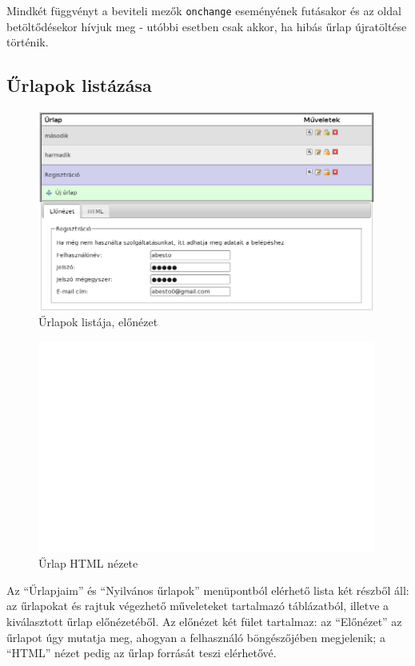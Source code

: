 \documentclass[12pt,a4paper,twoside]{article}
\begin{document}
Mindkét függvényt a beviteli mezők \texttt{onchange} eseményének futásakor és az
oldal betöltődésekor hívjuk meg - utóbbi esetben csak akkor, ha hibás űrlap
újratöltése történik.


\clearpage
{}
\subsection{Űrlapok listázása}

\begin{figure}[H]
\centering
  \includegraphics[width=420px]{form_list.png}
  \caption{Űrlapok listája, előnézet}
\end{figure}
\begin{figure}[H]
  \includegraphics[width=420px]{form_list_html.png}
  \caption{Űrlap HTML nézete}
\end{figure}
\clearpage

Az ``Űrlapjaim'' és ``Nyilvános űrlapok'' menüpontból elérhető lista két részből
áll: az űrlapokat és rajtuk végezhető műveleteket tartalmazó táblázatból,
illetve a kiválasztott űrlap előnézetéből. Az előnézet két fület tartalmaz: az
``Előnézet'' az űrlapot úgy mutatja meg, ahogyan a felhasználó böngészőjében
megjelenik; a ``HTML'' nézet pedig az űrlap forrását teszi elérhetővé.
\end{document}
